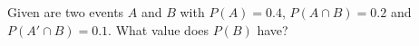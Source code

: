 Given are two events $A$ and $B$ with $P(A) = 0.4$, $P(A \cap B) = 0.2$ and $P(A' \cap B) = 0.1$.
What value does $P(B)$ have? 